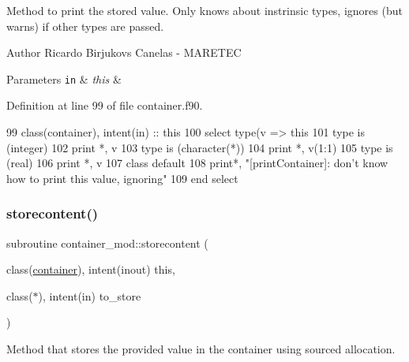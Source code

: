Method to print the stored value. Only knows about instrinsic types, ignores (but warns) if other types are passed. 

\begin{DoxyAuthor}{Author}
Ricardo Birjukovs Canelas -\/ M\+A\+R\+E\+T\+EC 
\end{DoxyAuthor}

\begin{DoxyParams}[1]{Parameters}
\mbox{\tt in}  & {\em this} & \\
\hline
\end{DoxyParams}


Definition at line 99 of file container.\+f90.


\begin{DoxyCode}
99     \textcolor{keywordtype}{class}(container), \textcolor{keywordtype}{intent(in)} :: this
100     \textcolor{keywordflow}{select type}(v => this%
101 \textcolor{keywordflow}{    type is} (integer)
102         print *, v
103 \textcolor{keywordflow}{    type is} (\textcolor{keywordtype}{character}(*))
104         print *, v(1:1)
105 \textcolor{keywordflow}{    type is} (real)
106         print *, v
107 \textcolor{keywordflow}{        class default}
108         print*, \textcolor{stringliteral}{"[printContainer]: don't know how to print this value, ignoring"}
109 \textcolor{keywordflow}{    end select}
\end{DoxyCode}
\mbox{\label{namespacecontainer__mod_ace49cee012b6cd3c41c03556ab0dd884}} 
\subsubsection{\texorpdfstring{storecontent()}{storecontent()}}
{\footnotesize\ttfamily subroutine container\+\_\+mod\+::storecontent (\begin{DoxyParamCaption}\item[{class(\mbox{\hyperlink{structcontainer__mod_1_1container}{container}}), intent(inout)}]{this,  }\item[{class($\ast$), intent(in)}]{to\+\_\+store }\end{DoxyParamCaption})\hspace{0.3cm}{\ttfamily [private]}}



Method that stores the provided value in the container using sourced allocation. 

